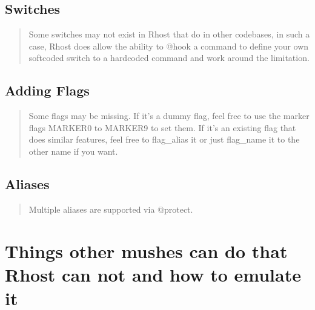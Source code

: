 \documentclass[letterpaper,10pt,english]{sphinxmanual}
\begin{document}
\subsection{Switches}
\label{\detokenize{differences:switches}}\begin{quote}

\sphinxAtStartPar
Some switches may not exist in Rhost that do in other codebases, in such
a case, Rhost does allow the ability to @hook a command to define your own
softcoded switch to a hardcoded command and work around the limitation.
\end{quote}


\subsection{Adding Flags}
\label{\detokenize{differences:adding-flags}}\begin{quote}

\sphinxAtStartPar
Some flags may be missing.  If it’s a dummy flag, feel free to use the
marker flags MARKER0 to MARKER9 to set them.  If it’s an existing flag
that does similar features, feel free to flag\_alias it or just flag\_name
it to the other name if you want.
\end{quote}


\subsection{Aliases}
\label{\detokenize{differences:aliases}}\begin{quote}

\sphinxAtStartPar
Multiple aliases are supported via @protect.
\end{quote}


\section{Things other mushes can do that Rhost can not and how to emulate it}
\label{\detokenize{differences:things-other-mushes-can-do-that-rhost-can-not-and-how-to-emulate-it}}
\end{document}
